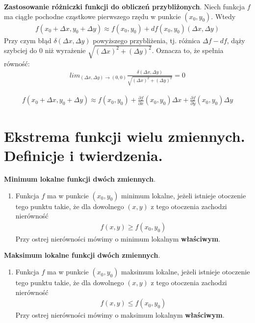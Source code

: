 \documentclass[12pt]{article}
\begin{document}
    \begin{theorem}
        \textbf{Zastosowanie różniczki funkcji do obliczeń przybliżonych}. Niech funkcja $f$ ma ciągłe pochodne cząstkowe
        pierwszego rzędu w punkcie $(x_0, y_0)$. Wtedy
        \begin{align*}
            f(x_0 + \Delta x, y_0 + \Delta y) \approx f(x_0, y_0) + df(x_0, y_0)(\Delta x, \Delta y)
        \end{align*}
        Przy czym błąd $\delta (\Delta x, \Delta y)$ powyższego przybliżenia, tj. różnica $\Delta f - df$, dąży szybciej
        do 0 niż wyrażenie $\sqrt{(\Delta x)^2 + (\Delta y)^2}$. Oznacza to, że spełnia równość:
        \begin{align*}
            lim_{(\Delta x, \Delta y) \rightarrow (0,0)} \frac{\delta (\Delta x, \Delta y)}{\sqrt{(\Delta x)^2 + (\Delta y)^2}} = 0
        \end{align*}


        \begin{align*}
            f(x_0 + \Delta x, y_0 + \Delta y) \approx f(x_0, y_0) + \frac{\partial f}{\partial x}(x_0, y_0) \Delta x + \frac{\partial f}{\partial y}(x_0, y_0) \Delta y
        \end{align*}
    \end{theorem}

    \newpage

    \section{Ekstrema funkcji wielu zmiennych. Definicje i twierdzenia.}

    \begin{definition}
        \textbf{Minimum lokalne funkcji dwóch zmiennych}.
        \begin{enumerate}
            \item Funkcja $f$ ma w punkcie $(x_0, y_0)$ minimum lokalne, jeżeli istnieje otoczenie tego punktu takie,
            że dla dowolnego $(x, y)$ z tego otoczenia zachodzi nierówność
            \begin{align*}
                f(x,y) \geq f(x_0, y_0)
            \end{align*}
            Przy ostrej nierówności mówimy o minimum lokalnym \textbf{właściwym}.
        \end{enumerate}
    \end{definition}

    \begin{definition}
        \textbf{Maksimum lokalne funkcji dwóch zmiennych}.
        \begin{enumerate}
            \item Funkcja $f$ ma w punkcie $(x_0, y_0)$ maksimum lokalne, jeżeli istnieje otoczenie tego punktu takie,
            że dla dowolnego $(x, y)$ z tego otoczenia zachodzi nierówność
            \begin{align*}
                f(x,y) \leq f(x_0, y_0)
            \end{align*}
            Przy ostrej nierówności mówimy o maksimum lokalnym \textbf{właściwym}.
        \end{enumerate}
    \end{definition}
\end{document}
